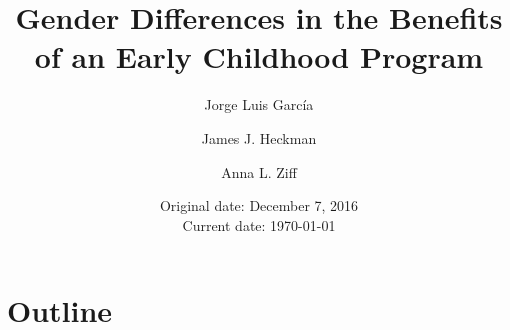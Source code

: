 








\title{Gender Differences in the Benefits of an Early Childhood Program}
\author{Jorge Luis Garc\'{i}a \and James J. Heckman \and Anna L. Ziff}
\date{Original date: December 7, 2016 \\ Current date: \today}
\maketitle

\section{Outline}

